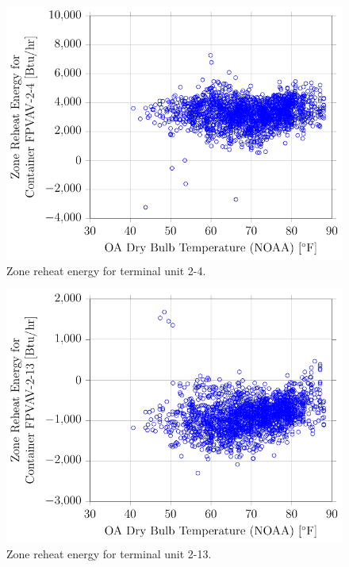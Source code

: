 \begin{figure}
\centering
\includegraphics[]{Plots/2016-10-19-1438-ZoneReheatEnergyforContainerFPVAV24vsOADryBulbTemperatureNOAA.pdf}
\caption{Zone reheat energy for terminal unit 2-4.}
\label{fig:2016-10-19-1438-ZoneReheatEnergyforContainerFPVAV24vsOADryBulbTemperatureNOAA}
\end{figure}

\begin{figure}
\centering
\includegraphics[]{Plots/2016-10-19-1521-ZoneReheatEnergyforContainerFPVAV213vsOADryBulbTemperatureNOAA.pdf}
\caption{Zone reheat energy for terminal unit 2-13.}
\label{fig:2016-10-19-1521-ZoneReheatEnergyforContainerFPVAV213vsOADryBulbTemperatureNOAA}
\end{figure}



